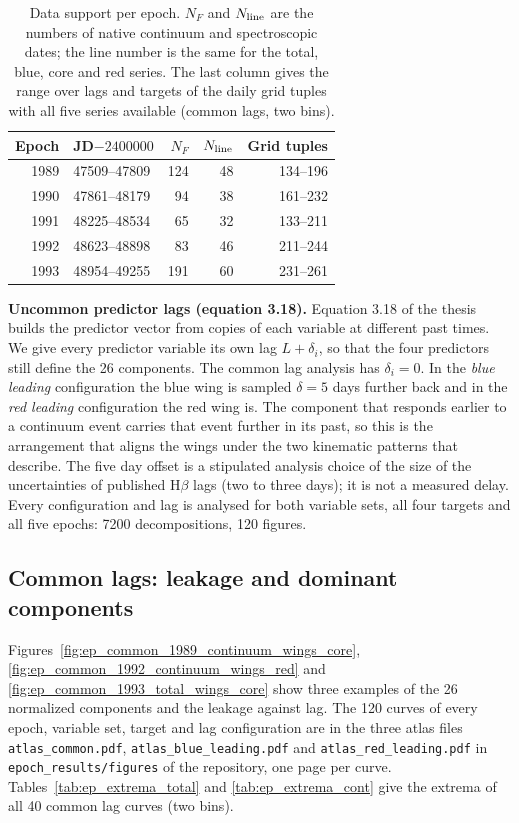 \documentclass[fleqn,usenatbib]{mnras}
\newenvironment{SURDtable}{\begin{table}}{\end{table}}
\begin{document}
\begin{SURDtable}
\centering
\caption{Data support per epoch. $N_F$ and $N_{\rm line}$ are the numbers of
native continuum and spectroscopic dates; the line number is the same for the
total, blue, core and red series. The last column gives the range over lags and
targets of the daily grid tuples with all five series available (common lags,
two bins).}
\label{tab:ep_support}
\small
\begin{tabular}{rlrrr}
\toprule
Epoch & JD$-2400000$ & $N_F$ & $N_{\rm line}$ & Grid tuples \\
\midrule
1989 & 47509--47809 & 124 & 48 & 134--196 \\
1990 & 47861--48179 & 94 & 38 & 161--232 \\
1991 & 48225--48534 & 65 & 32 & 133--211 \\
1992 & 48623--48898 & 83 & 46 & 211--244 \\
1993 & 48954--49255 & 191 & 60 & 231--261 \\
\bottomrule
\end{tabular}

\end{SURDtable}

\textbf{Uncommon predictor lags (equation 3.18).} Equation 3.18 of the thesis
builds the predictor vector from copies of each variable at different past
times. We give every predictor variable its own lag $L+\delta_i$, so that the four
predictors still define the 26 components. The common lag analysis has
$\delta_i=0$. In the \emph{blue leading} configuration the blue wing is sampled
$\delta=5$ days further back and in the \emph{red leading} configuration the red
wing is. The component that responds earlier to a continuum event carries that
event further in its past, so this is the arrangement that aligns the wings
under the two kinematic patterns that \citet{Xi2025} describe. The five day
offset is a stipulated analysis choice of the size of the uncertainties of
published H$\beta$ lags (two to three days); it is not a measured delay. Every
configuration and lag is analysed for both variable sets, all four targets and all
five epochs: 7200 decompositions, 120 figures.

\subsection{Common lags: leakage and dominant components}

Figures~\ref{fig:ep_common_1989_continuum_wings_core},
\ref{fig:ep_common_1992_continuum_wings_red} and \ref{fig:ep_common_1993_total_wings_core}
show three examples of the 26 normalized components and the leakage against lag. The 120
curves of every epoch, variable set, target and lag configuration are in the three atlas
files \texttt{atlas\_common.pdf}, \texttt{atlas\_blue\_leading.pdf} and
\texttt{atlas\_red\_leading.pdf} in \texttt{epoch\_results/figures} of the
repository, one page per curve. Tables~\ref{tab:ep_extrema_total} and
\ref{tab:ep_extrema_cont} give the extrema of all 40 common lag curves (two bins).
\end{document}
